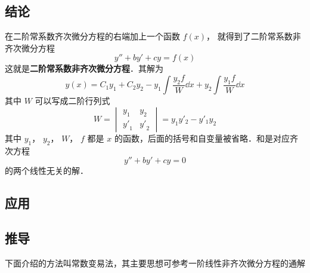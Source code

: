 

\subsection{结论}

在二阶常系数齐次微分方程的右端加上一个函数 $f(x)$， 就得到了二阶常系数非齐次微分方程
\begin{equation}\label{Ode2N_eq1}
y'' + by' + cy = f(x)
\end{equation}
这就是\textbf{二阶常系数非齐次微分方程}．其解为
\begin{equation}
y(x) = {C_1}{y_1} + {C_2}{y_2} - {y_1}\int \frac{{y_2}f}{W} \dd{x} + {y_2}\int \frac{{y_1}f}{W} \dd{x}
\end{equation}
其中 $W$ 可以写成二阶行列式
\begin{equation}
W = 
\begin{vmatrix}
{{y_1}}&{{y_2}}\\
{{{y'}_1}}&{{{y'}_2}}
\end{vmatrix} = {y_1}{y'_2} - {y'_1}{y_2}
\end{equation}
其中 $y_1$，  $y_2$，  $W$，  $f$ 都是 $x$ 的函数，后面的括号和自变量被省略．和是对应齐次方程 
\begin{equation}\label{Ode2N_eq4}
y'' + by' + cy = 0
\end{equation}
的两个线性无关的解．

\subsection{应用} %

\subsection{推导}

下面介绍的方法叫常数变易法，其主要思想可参考一阶线性非齐次微分方程的通解%

